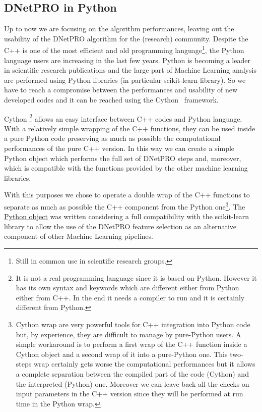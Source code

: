 \documentclass{standalone}
\begin{document}
\subsection[Python wrap]{DNetPRO in Python}\label{implementation:python}

Up to now we are focusing on the algorithm performances, leaving out the usability of the \textsf{DNetPRO} algorithm for the (research) community.
Despite the \textsf{C++} is one of the most efficient and old programming language\footnote{
  Still in common use in scientific research groups.
}, the \textsf{Python} language users are increasing in the last few years.
\textsf{Python} is becoming a leader in scientific research publications and the large part of Machine Learning analysis are performed using \textsf{Python} libraries (in particular \textsf{scikit-learn} library).
So we have to reach a compromise between the performances and usability of new developed codes and it can be reached using the \textsf{Cython}~\cite{behnel2010cython} framework.

\textsf{Cython} \footnote{
  It is not a real programming language since it is based on \textsf{Python}.
  However it has its own syntax and keywords which are different either from \textsf{Python} either from \textsf{C++}.
  In the end it needs a compiler to run and it is certainly different from \textsf{Python}.
} allows an easy interface between \textsf{C++} codes and \textsf{Python} language.
With a relatively simple wrapping of the \textsf{C++} functions, they can be used inside a pure \textsf{Python} code preserving as much as possible the computational performances of the pure \textsf{C++} version.
In this way we can create a simple \textsf{Python} object which performs the full set of \textsf{DNetPRO} steps and, moreover, which is compatible with the functions provided by the other machine learning libraries.

With this purposes we chose to operate a double wrap of the \textsf{C++} functions to separate as much as possible the \textsf{C++} component from the \textsf{Python} one\footnote{
  \textsf{Cython} wrap are very powerful tools for \textsf{C++} integration into \textsf{Python} code but, by experience, they are difficult to manage by pure-\textsf{Python} users.
  A simple workaround is to perform a first wrap of the \textsf{C++} function inside a \textsf{Cython} object and a second wrap of it into a pure-\textsf{Python} one.
  This two-steps wrap certainly gets worse the computational performances but it allows a complete separation between the compiled part of the code (\textsf{Cython}) and the interpreted (\textsf{Python}) one.
  Moreover we can leave back all the checks on input parameters
  in the \textsf{C++} version since they will be performed at run time in the \textsf{Python} wrap.
}.
The \href{https://github.com/Nico-Curti/DNetPRO/blob/master/DNetPRO/DNetPRO.py}{\textsf{Python} object} was written considering a full compatibility with the \textsf{scikit-learn} library to allow the use of the \textsf{DNetPRO} feature selection as an alternative component of other Machine Learning pipelines.
\end{document}
